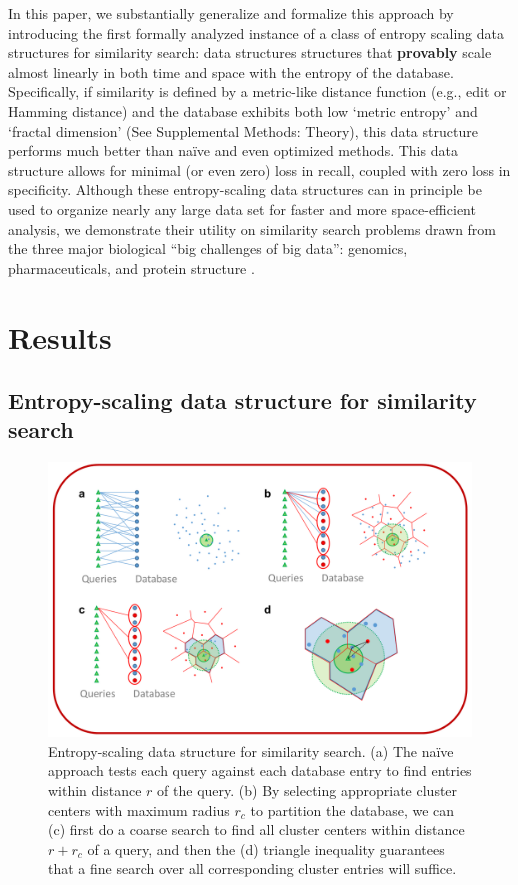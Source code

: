 \documentclass[review,preprint,12pt]{elsarticle}
\renewcommand{\cite}{\citep} %
\theoremstyle{definition}
\theoremstyle{remark}
\numberwithin{equation}{section}
\begin{document}
In this paper, we substantially generalize and formalize this approach by introducing the first formally analyzed instance of a class of entropy scaling data structures for similarity search: data structures structures that \textbf{provably} scale almost linearly in both time and space with the entropy of the database.
Specifically, if similarity is defined by a metric-like distance function (e.g., edit or Hamming distance) and the database exhibits both low `metric entropy' and `fractal dimension' (See Supplemental Methods: Theory), this data structure performs much better than na\"ive and even optimized methods.
This data structure allows for minimal (or even zero) loss in recall, coupled
with zero loss in specificity.
Although these entropy-scaling data structures can in principle be used to organize nearly any large data set for faster and more space-efficient analysis,
we demonstrate their utility on similarity search problems drawn from the three major biological ``big challenges of big data'': genomics, pharmaceuticals, and protein structure \cite{marx2013biology}.

\section{Results}
\subsection{Entropy-scaling data structure for similarity search}
\begin{figure}[btp]
    \centering
    \includegraphics[width=1\textwidth]{assets/dataStructure.png}
    \caption{ Entropy-scaling data structure for similarity search. %
            (a) The na\"ive approach tests each query against each database entry to find entries within distance $r$  of the query. %
            (b) By selecting appropriate cluster centers with maximum radius $r_c$ to partition the database, we can (c) first do a coarse search to find all cluster centers within distance $r+r_c$ of a query, and then the (d) triangle inequality guarantees that a fine search over all corresponding cluster entries will suffice.}
    \label{fig:dataStructure}
\end{figure}
\end{document}
